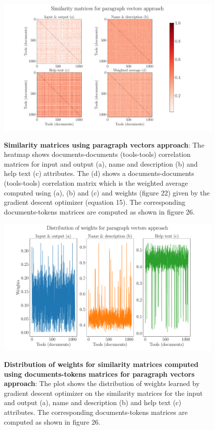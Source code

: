 \begin{figure}[h]
\begin{centering}    
    {\includegraphics[scale=0.4]{figures/Similarity_matrices_doc2vec.pdf}}
    \caption[Similarity matrices using paragraph vectors approach]{\textbf{Similarity matrices using paragraph vectors approach}: The heatmap shows documents-documents (tools-tools) correlation matrices for input and output (a), name and description (b) and help text (c) attributes. The (d) shows a documents-documents (tools-tools) correlation matrix which is the weighted average computed using (a), (b) and (c) and weights (figure 22) given by the gradient descent optimizer (equation 15). The corresponding documents-tokens matrices are computed as shown in figure 26.}
\end{centering}
\end{figure}

\begin{figure}[h]
\begin{centering}
    {\includegraphics[scale=0.35]{figures/Weights_doc2vec.pdf}}
    \caption[Distribution of weights for similarity matrices computed using documents-tokens matrices for paragraph vectors approach]{\textbf{Distribution of weights for similarity matrices computed using documents-tokens matrices for paragraph vectors approach}: The plot shows the distribution of weights learned by gradient descent optimizer on the similarity matrices for the input and output (a), name and description (b) and help text (c) attributes. The corresponding documents-tokens matrices are computed as shown in figure 26.}
\end{centering}
\end{figure}

